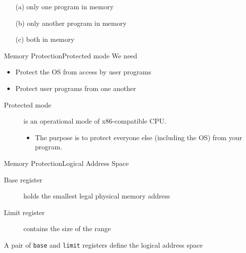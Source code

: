 \begin{enumerate}
\item[(a)] only one program in memory
\item[(b)] only another program in memory
\item[(c)] both in memory
\end{enumerate}

\begin{frame}{Memory Protection}{Protected mode}
  We need
  \begin{itemize}
  \item Protect the OS from access by user programs
  \item Protect user programs from one another
  \end{itemize}
  \begin{description}
  \item[Protected mode] is an operational mode of x86-compatible CPU.
    \begin{itemize}
    \item The purpose is to protect everyone else (including the OS) from your program.
    \end{itemize}
  \end{description}
\end{frame}

\begin{frame}{Memory Protection}{Logical Address Space}
  \begin{description}
  \item[Base register] holds the smallest legal physical memory address
  \item[Limit register] contains the size of the range
  \end{description}
  \begin{minipage}{.3\textwidth}
    \centering
  \end{minipage}\quad
  \begin{minipage}{.65\textwidth}
    A pair of \texttt{base} and \texttt{limit} registers define the logical address space
    \begin{center}
    \end{center}
    \begin{center}
      {}
    \end{center}
    \begin{center}
    \end{center}
  \end{minipage}
\end{frame}

